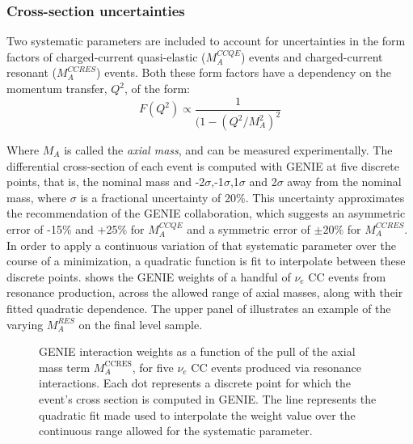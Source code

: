 \subsubsection{Cross-section uncertainties}
\label{sec:xsec_systs}
Two systematic parameters are included to account for uncertainties in the form factors of charged-current quasi-elastic ($M_{A}^{CCQE}$) events and charged-current resonant ($M_{A}^{CCRES}$) events. Both these form factors have a dependency on the momentum transfer, $Q^2$, of the form:\\

\begin{equation}
    F(Q^{2}) \propto \frac{1}{(1-(Q^{2}/M_{A}^{2})^{2}}
\end{equation}

Where $M_{A}$ is called the \textit{axial mass}, and can be measured experimentally.
The differential cross-section of each event is computed with \textsc{GENIE} at five discrete points, that is, the nominal mass and  -2$\sigma$,-1$\sigma$,1$\sigma$ and 2$\sigma$ away from the nominal mass, where $\sigma$ is a fractional uncertainty of 20\%.
This uncertainty approximates the recommendation of the GENIE collaboration, which suggests an asymmetric error of -15\% and +25\% for $M_A^{CCQE}$ and a symmetric error of $\pm20\%$ for $M_A^{CCRES}$\cite{Andreopoulos:2015wxa}.
In order to apply a continuous variation of that systematic parameter over the course of a minimization, a quadratic function is fit to interpolate between these discrete points.
 shows the \textsc{GENIE} weights of a handful of $\nu_{e}$ CC events from resonance production, across the allowed range of axial masses, along with their fitted quadratic dependence.
The upper panel of  illustrates an example of the varying $M_{A}^{RES}$ on the final level sample.

\begin{figure}
    \centering
    
    \caption{\textsc{GENIE} interaction weights as a function of the pull of the axial mass term $M_{A}^{\mathrm{CCRES}}$, for five $\nu_{e}$ CC events produced via resonance interactions. Each dot represents a discrete point for which the event's cross section is computed in \textsc{GENIE}. The  line represents the quadratic fit made used to interpolate the weight value over the continuous range allowed for the systematic parameter.}
    \label{fig:resonant_mass}
\end{figure}

